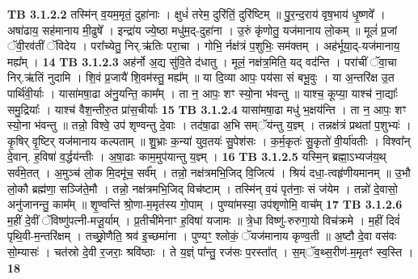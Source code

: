 \documentclass[17pt]{extarticle}
\begin{document}
                  \newline
                                \textbf{ TB 3.1.2.2} \newline
                  तस्मि॑न् व॒यम॒मृतं॒ दुहा॑नाः । क्षुधं॑ तरेम॒ दुरि॑तिं॒ दुरि॑ष्टिम् ॥ पु॒र॒न्द॒राय॑ वृष॒भाय॑ धृ॒ष्णवे᳚ । अषा॑ढाय॒ सह॑मानाय मी॒ढुषे᳚ । इन्द्रा॑य ज्ये॒ष्ठा मधु॑म॒द्-दुहा॑ना । उ॒रुं कृ॑णोतु॒ यज॑मानाय लो॒कम् ॥ मूलं॑ प्र॒जां ॅवी॒रव॑तीं ॅविदेय । परा᳚च्येतु॒ निर्.ऋ॑तिः परा॒चा । गोभि॒ र्नक्ष॑त्रं प॒शुभिः॒ सम॑क्तम् । अह॑र्भूया॒द्-यज॑मानाय॒ मह्य᳚म् । \textbf{ 14} \newline
                  \newline
                                \textbf{ TB 3.1.2.3} \newline
                  अह॑र्नो अ॒द्य सु॑वि॒ते द॑धातु । मूलं॒ नक्ष॑त्र॒मिति॒ यद् वद॑न्ति । परा॑चीं ॅवा॒चा निर्.ऋ॑तिं नुदामि । शि॒वं प्र॒जायै॑ शि॒वम॑स्तु॒ मह्य᳚म् ॥ या दि॒व्या आपः॒ पय॑सा सं बभू॒वुः । या अ॒न्तरि॑क्ष उ॒त पार्थि॑वी॒र्याः । यासा॑मषा॒ढा अ॑नु॒यन्ति॒ काम᳚म् । ता न॒ आपः॒ शꣳ स्यो॒ना भ॑वन्तु ॥ याश्च॒ कूप्या॒ याश्च॑ ना॒द्याः᳚ समु॒द्रियाः᳚ । याश्च॑ वैश॒न्तीरु॒त प्रा॑स॒चीर्याः \textbf{ 15} \newline
                  \newline
                                \textbf{ TB 3.1.2.4} \newline
                  यासा॑मषा॒ढा मधु॑ भ॒क्षय॑न्ति । ता न॒ आपः॒ शꣳ स्यो॒ना भ॑वन्तु ॥ तन्नो॒ विश्वे॒ उप॑ शृण्वन्तु दे॒वाः । तद॑षा॒ढा अ॒भि सम्ॅय॑न्तु य॒ज्ञ्म् । तन्नक्ष॑त्रं प्रथतां प॒शुभ्यः॑ । कृ॒षिर् वृ॒ष्टिर् यज॑मानाय कल्पताम् ॥ शु॒भ्राः क॒न्या॑ युव॒तयः॑ सु॒पेश॑सः । क॒र्म॒कृतः॑ सु॒कृतो॑ वी॒र्या॑वतीः । विश्वा᳚न् दे॒वान्. ह॒विषा॑ व॒र्द्धय॑न्तीः । अ॒षा॒ढाः काम॒मुप॑यान्तु य॒ज्ञ्म् । \textbf{ 16} \newline
                  \newline
                                \textbf{ TB 3.1.2.5} \newline
                  यस्मि॒न् ब्रह्मा॒ऽभ्यज॑य॒थ् सर्व॑मे॒तत् । अ॒मुञ्च॑ लो॒क मि॒दमू॑च॒ सर्व᳚म् । तन्नो॒ नक्ष॑त्रमभि॒जिद् वि॒जित्य॑ । श्रियं॑ दधा॒-त्वहृ॑णीयमानम् ॥ उ॒भौ लो॒कौ ब्रह्म॑णा॒ सञ्जि॑ते॒मौ । तन्नो॒ नक्ष॑त्रमभि॒जिद् विच॑ष्टाम् । तस्मि॑न् व॒यं पृत॑नाः॒ सं ज॑येम । तन्नो॑ दे॒वासो॒ अनु॑जानन्तु॒ काम᳚म् ॥ शृ॒ण्वन्ति॑ श्रो॒णा-म॒मृत॑स्य गो॒पाम् । पुण्या॑मस्या॒ उप॑शृणोमि॒ वाच᳚म् \textbf{ 17} \newline
                  \newline
                                \textbf{ TB 3.1.2.6} \newline
                  म॒हीं दे॒वीं ॅविष्णु॑पत्नी-मजू॒र्याम् । प्र॒तीची॑मेनाꣳ ह॒विषा॑ यजामः ॥ त्रे॒धा विष्णु॑-रुरुगा॒यो विच॑क्रमे । म॒हीं दिवं॑ पृथि॒वी-म॒न्तरि॑क्षम् । तच्छ्रो॒णैति॒ श्रव॑ इ॒च्छमा॑ना । पुण्यꣳ॒॒ श्लोकं॒ ॅयज॑मानाय कृण्व॒ती ॥ अ॒ष्टौ दे॒वा वस॑वः सो॒म्यासः॑ । चत॑स्रो दे॒वी र॒जराः॒ श्रवि॑ष्ठाः । ते य॒ज्ञ्ं पा᳚न्तु॒ रज॑सः प॒रस्ता᳚त् । स॒म्ॅव॒थ्स॒रीण॑-म॒मृतꣳ॑ स्व॒स्ति । \textbf{ 18} \newline
\end{document}
